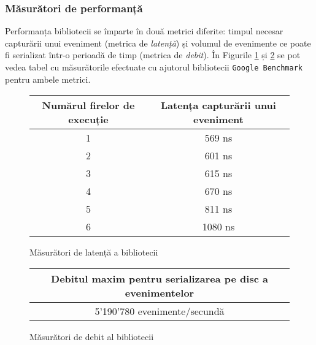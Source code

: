 \subsubsection{Măsurători de performanță}\label{library-performance}

Performanța bibliotecii se împarte în două metrici diferite: timpul
necesar capturării unui eveniment (metrica de \textit{latență}) și
volumul de evenimente ce poate fi serializat într-o perioadă de timp
(metrica de \textit{debit}). În Figurile \ref{fig:lib-perf-latency} și
\ref{fig:lib-perf-throughput} se pot vedea tabel cu măsurătorile
efectuate cu ajutorul bibliotecii
\lstinline{Google Benchmark}\cite{GoogleBenchmark} pentru ambele
metrici.

\begin{figure}[H]
\centering

\begin{center}
    \begin{tabular}{||c c||} 
        \hline
        Numărul firelor de execuție & Latența capturării unui eveniment \\ [0.5ex] 
        \hline\hline
        1 & 569 ns \\ \hline
        2 & 601 ns \\ \hline
        3 & 615 ns \\ \hline
        4 & 670 ns \\ \hline
        5 & 811 ns \\ \hline
        6 & 1080 ns \\ \hline
    \end{tabular}
\end{center}

\caption{Măsurători de latență a bibliotecii}
\label{fig:lib-perf-latency}
\end{figure}

\begin{figure}[H]
\centering

\begin{center}
    \begin{tabular}{||c||} 
        \hline
        Debitul maxim pentru serializarea pe disc a evenimentelor \\ [0.5ex] 
        \hline\hline
        5'190'780 evenimente/secundă \\ \hline
    \end{tabular}
\end{center}

\caption{Măsurători de debit al bibliotecii}
\label{fig:lib-perf-throughput}
\end{figure}

